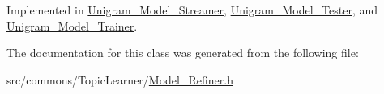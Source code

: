 Implemented in \hyperlink{class_unigram___model___streamer_a236395088d23966ec59a85582e4d470f}{Unigram\_\-Model\_\-Streamer}, \hyperlink{class_unigram___model___tester_a9f9538866008fd7dfd681faaf4562b74}{Unigram\_\-Model\_\-Tester}, and \hyperlink{class_unigram___model___trainer_aab907b06b666d441ec60c4703d2a8e4e}{Unigram\_\-Model\_\-Trainer}.



The documentation for this class was generated from the following file:\begin{DoxyCompactItemize}
\item 
src/commons/TopicLearner/\hyperlink{_model___refiner_8h}{Model\_\-Refiner.h}\end{DoxyCompactItemize}

